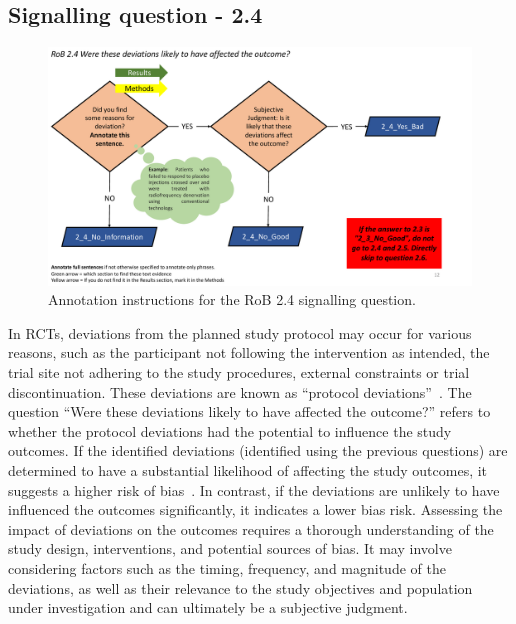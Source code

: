 \documentclass[sn-mathphys,Numbered]{sn-jnl}%
\begin{document}
\subsection*{Signalling question - 2.4 }
\label{subsec:2_4}
%
%
%
\begin{figure}[hbt]
    \centering
    \includegraphics[width=\textwidth]{figures/2_4.pdf}
    \caption{Annotation instructions for the RoB 2.4 signalling question.}
    \label{fig:2_4}
\end{figure}
%
%
%
In RCTs, deviations from the planned study protocol may occur for various reasons, such as the participant not following the intervention as intended, the trial site not adhering to the study procedures, external constraints or trial discontinuation.
These deviations are known as ``protocol deviations''~\cite{folayan2019challenges,merli2020immediate}.
The question ``Were these deviations likely to have affected the outcome?'' refers to whether the protocol deviations had the potential to influence the study outcomes.
If the identified deviations (identified using the previous questions) are determined to have a substantial likelihood of affecting the study outcomes, it suggests a higher risk of bias~\cite{dodd2012nonadherence}. 
In contrast, if the deviations are unlikely to have influenced the outcomes significantly, it indicates a lower bias risk.
Assessing the impact of deviations on the outcomes requires a thorough understanding of the study design, interventions, and potential sources of bias.
It may involve considering factors such as the timing, frequency, and magnitude of the deviations, as well as their relevance to the study objectives and population under investigation and can ultimately be a subjective judgment.
\end{document}
